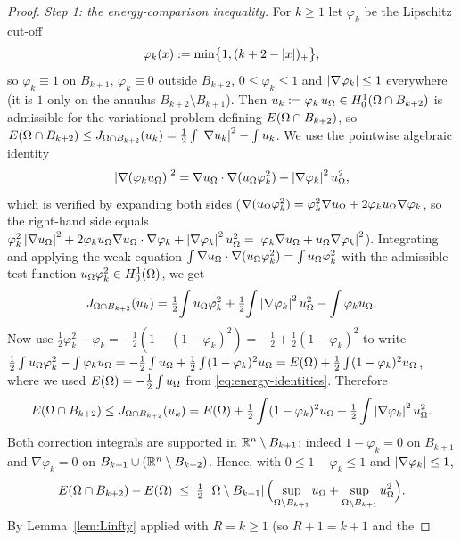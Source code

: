\begin{proof}
\smallskip
\emph{Step 1: the energy-comparison inequality.}
For $k\ge1$ let $\varphi_k$ be the Lipschitz cut-off
\[
   \varphi_k(x):=\min\bigl\{1,(k+2-\left|x\right|)_+\bigr\},
\]
so $\varphi_k\equiv1$ on $B_{k+1}$, $\varphi_k\equiv0$ outside $B_{k+2}$,
$0\le\varphi_k\le1$ and $\left|\nabla\varphi_k\right|\le1$ everywhere (it is
$1$ only on the annulus $B_{k+2}\setminus B_{k+1}$). Then
$u_k:=\varphi_k\,u_\Omega\in H^1_0(\Omega\cap B_{k+2})$ is admissible for the
variational problem defining $E(\Omega\cap B_{k+2})$, so
$E(\Omega\cap B_{k+2})\le J_{\Omega\cap B_{k+2}}(u_k)
=\tfrac12\int\left|\nabla u_k\right|^2-\int u_k$. We use the pointwise algebraic
identity
\[
   \left|\nabla(\varphi_k u_\Omega)\right|^2
   =\nabla u_\Omega\cdot\nabla(u_\Omega\varphi_k^2)
   +\left|\nabla\varphi_k\right|^2u_\Omega^2,
\]
which is verified by expanding both sides
($\nabla(u_\Omega\varphi_k^2)=\varphi_k^2\nabla u_\Omega
+2\varphi_k u_\Omega\nabla\varphi_k$, so the right-hand side equals
$\varphi_k^2\left|\nabla u_\Omega\right|^2+2\varphi_k u_\Omega\nabla u_\Omega\cdot
\nabla\varphi_k+\left|\nabla\varphi_k\right|^2 u_\Omega^2
=\left|\varphi_k\nabla u_\Omega+u_\Omega\nabla\varphi_k\right|^2$). Integrating and
applying the weak equation
$\int\nabla u_\Omega\cdot\nabla(u_\Omega\varphi_k^2)=\int u_\Omega\varphi_k^2$
with the admissible test function $u_\Omega\varphi_k^2\in H^1_0(\Omega)$, we
get
\[
   J_{\Omega\cap B_{k+2}}(u_k)
   =\tfrac12\!\int u_\Omega\varphi_k^2
   +\tfrac12\!\int\left|\nabla\varphi_k\right|^2u_\Omega^2
   -\int\varphi_k u_\Omega .
\]
Now use $\tfrac12\varphi_k^2-\varphi_k=-\tfrac12(1-(1-\varphi_k)^2)
=-\tfrac12+\tfrac12(1-\varphi_k)^2$ to write
$\tfrac12\int u_\Omega\varphi_k^2-\int\varphi_k u_\Omega
=-\tfrac12\int u_\Omega+\tfrac12\int(1-\varphi_k)^2u_\Omega
=E(\Omega)+\tfrac12\int(1-\varphi_k)^2u_\Omega$, where we used
$E(\Omega)=-\tfrac12\int u_\Omega$ from \eqref{eq:energy-identities}.
Therefore
\begin{equation}\label{eq:energy-exact}
   E(\Omega\cap B_{k+2})\le J_{\Omega\cap B_{k+2}}(u_k)
   =E(\Omega)+\tfrac12\int(1-\varphi_k)^2u_\Omega
          +\tfrac12\int\left|\nabla\varphi_k\right|^2u_\Omega^2 .
\end{equation}
Both correction integrals are supported in $\mathbb{R}^n\setminus B_{k+1}$:
indeed $1-\varphi_k=0$ on $B_{k+1}$ and $\nabla\varphi_k=0$ on
$B_{k+1}\cup(\mathbb{R}^n\setminus B_{k+2})$. Hence, with $0\le1-\varphi_k\le1$
and $\left|\nabla\varphi_k\right|\le1$,
\begin{equation}\label{eq:energy-comp-pre}
   E(\Omega\cap B_{k+2})-E(\Omega)
   \;\le\;\tfrac12\,\left|\Omega\setminus B_{k+1}\right|
   \Bigl(\sup_{\Omega\setminus B_{k+1}}u_\Omega
        +\sup_{\Omega\setminus B_{k+1}}u_\Omega^2\Bigr).
\end{equation}
By Lemma~\ref{lem:Linfty} applied with $R=k\ge1$ (so $R+1=k+1$ and the

\end{proof}
